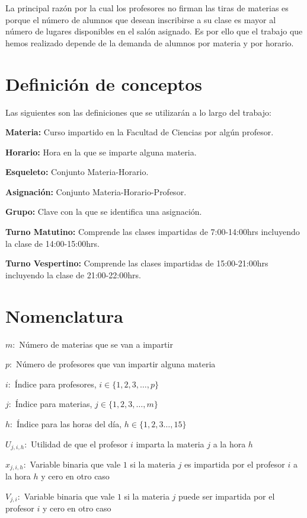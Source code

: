La principal razón por la cual los profesores no firman las tiras de materias es porque el número de alumnos que desean inscribirse a su clase es mayor al número de lugares disponibles en el salón asignado. Es por ello que el trabajo que hemos realizado depende de la demanda de alumnos por materia y por horario.



\section{Definición de conceptos}

Las siguientes son las definiciones que se utilizarán a lo largo del trabajo:

\textbf{Materia:} Curso impartido en la Facultad de Ciencias por algún profesor.

\textbf{Horario:} Hora en la que se imparte alguna materia.

\textbf{Esqueleto:} Conjunto Materia-Horario.

\textbf{Asignación:} Conjunto Materia-Horario-Profesor.

\textbf{Grupo:} Clave con la que se identifica una asignación.

\textbf{Turno Matutino:} Comprende las clases impartidas de 7:00-14:00hrs incluyendo la clase de 14:00-15:00hrs.

\textbf{Turno Vespertino:} Comprende las clases impartidas de 15:00-21:00hrs incluyendo la clase de 21:00-22:00hrs.


\section{Nomenclatura}

$m:$ Número de materias que se van a impartir

$p:$ Número de profesores que van impartir alguna materia

$i:$ Índice para profesores, $i \in \{ 1, 2, 3, \ldots, p \}$

$j:$ Índice para materias, $j \in \{ 1, 2, 3, \ldots, m \}$

$h:$ Índice para las horas del día, $h \in \{ 1, 2, 3 \ldots, 15\}$

$U_{j,i,h}:$ Utilidad de que el profesor $i$ imparta la materia $j$ a la hora $h$

$x_{j,i,h}:$ Variable binaria que vale $1$ si la materia $j$ es impartida por el profesor $i$ a la hora $h$ y cero en otro caso

$V_{j,i}:$ Variable binaria que vale $1$ si la materia $j$ puede ser impartida por  el profesor $i$ y cero en otro caso

